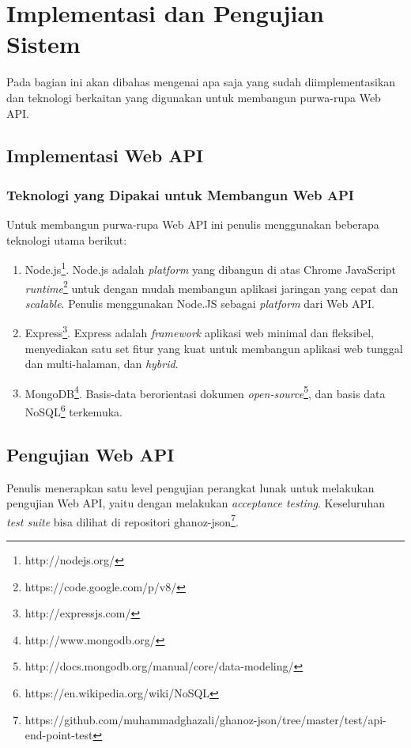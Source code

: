 \documentclass[a4paper, 12pt, oneside]{report}
\begin{document}
\chapter{Implementasi dan Pengujian Sistem}

\onehalfspacing Pada bagian ini akan dibahas mengenai apa saja yang sudah diimplementasikan dan teknologi berkaitan yang digunakan untuk membangun purwa-rupa Web API.

\section{Implementasi Web API}

\subsection{Teknologi yang Dipakai untuk Membangun Web API}

\onehalfspacing Untuk membangun purwa-rupa Web API ini penulis menggunakan beberapa teknologi utama berikut:

\begin{enumerate}
  \item Node.js\footnote{http://nodejs.org/}. Node.js adalah \textit{platform} yang dibangun di atas Chrome JavaScript \textit{runtime}\footnote{https://code.google.com/p/v8/} untuk dengan mudah membangun aplikasi jaringan yang cepat dan \textit{scalable}. Penulis menggunakan Node.JS sebagai \textit{platform} dari Web API.
  \item Express\footnote{http://expressjs.com/}. Express adalah \textit{framework} aplikasi web minimal dan fleksibel, menyediakan satu set fitur yang kuat untuk membangun aplikasi web tunggal dan multi-halaman, dan \textit{hybrid}.
  \item MongoDB\footnote{http://www.mongodb.org/}. Basis-data berorientasi dokumen \textit{open-source}\footnote{http://docs.mongodb.org/manual/core/data-modeling/}, dan basis data NoSQL\footnote{https://en.wikipedia.org/wiki/NoSQL} terkemuka.
\end{enumerate}

\section{Pengujian Web API}

Penulis menerapkan satu level pengujian perangkat lunak untuk melakukan pengujian Web API, yaitu dengan melakukan \textit{acceptance testing}. Keseluruhan \textit{test suite} bisa dilihat di repositori ghanoz-json\footnote{https://github.com/muhammadghazali/ghanoz-json/tree/master/test/api-end-point-test}.
\end{document}
